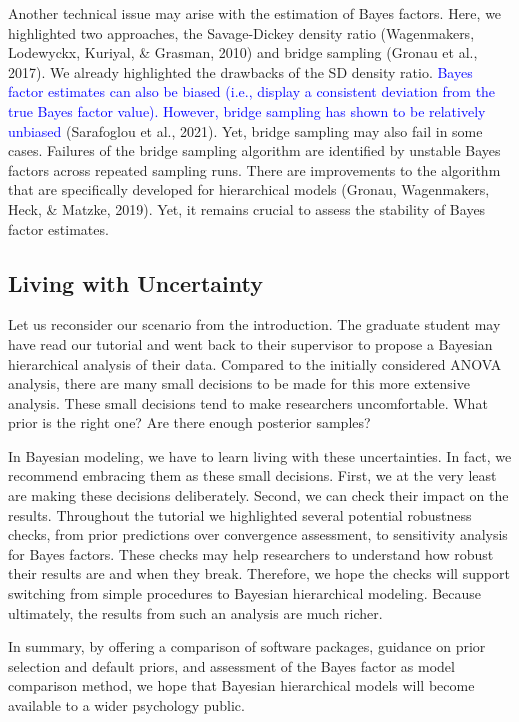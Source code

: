 \documentclass[
  english,
  doc,floatsintext]{apa6}
\begin{document}
Another technical issue may arise with the estimation of Bayes factors. Here, we highlighted two approaches, the Savage-Dickey density ratio (Wagenmakers, Lodewyckx, Kuriyal, \& Grasman, 2010) and bridge sampling (Gronau et al., 2017). We already highlighted the drawbacks of the SD density ratio. \textcolor{blue}{Bayes factor estimates can also be biased (i.e., display a consistent deviation from the true Bayes factor value). However, bridge sampling has shown to be relatively unbiased} (Sarafoglou et al., 2021). Yet, bridge sampling may also fail in some cases. Failures of the bridge sampling algorithm are identified by unstable Bayes factors across repeated sampling runs. There are improvements to the algorithm that are specifically developed for hierarchical models (Gronau, Wagenmakers, Heck, \& Matzke, 2019). Yet, it remains crucial to assess the stability of Bayes factor estimates.

\hypertarget{living-with-uncertainty}{%
\subsection{Living with Uncertainty}\label{living-with-uncertainty}}

Let us reconsider our scenario from the introduction. The graduate student may have read our tutorial and went back to their supervisor to propose a Bayesian hierarchical analysis of their data. Compared to the initially considered ANOVA analysis, there are many small decisions to be made for this more extensive analysis. These small decisions tend to make researchers uncomfortable. What prior is the right one? Are there enough posterior samples?

In Bayesian modeling, we have to learn living with these uncertainties. In fact, we recommend embracing them as these small decisions. First, we at the very least are making these decisions deliberately. Second, we can check their impact on the results. Throughout the tutorial we highlighted several potential robustness checks, from prior predictions over convergence assessment, to sensitivity analysis for Bayes factors. These checks may help researchers to understand how robust their results are and when they break. Therefore, we hope the checks will support switching from simple procedures to Bayesian hierarchical modeling. Because ultimately, the results from such an analysis are much richer.

In summary, by offering a comparison of software packages, guidance on prior selection and default priors, and assessment of the Bayes factor as model comparison method, we hope that Bayesian hierarchical models will become available to a wider psychology public.
\end{document}

